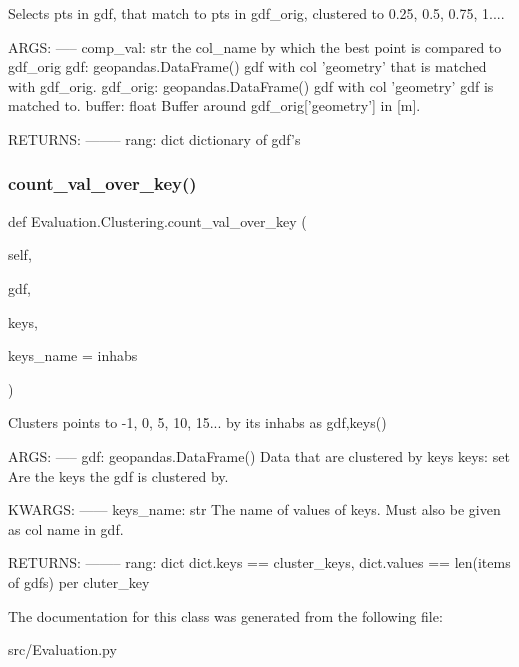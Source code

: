 \begin{DoxyVerb}Selects pts in gdf, that match to pts in gdf_orig,
clustered to 0.25, 0.5, 0.75, 1....

ARGS:
-----
comp_val: str
    the col_name by which the best point is compared to gdf_orig
gdf: geopandas.DataFrame()
    gdf with col 'geometry' that is matched with gdf_orig.
gdf_orig: geopandas.DataFrame()
    gdf with col 'geometry' gdf is matched to.
buffer: float
    Buffer around gdf_orig['geometry'] in [m].

RETURNS:
--------
rang: dict
    dictionary of gdf's
\end{DoxyVerb}
 \mbox{\label{class_evaluation_1_1_clustering_a97093141aaad40fcc7a8df2f214200bb}} 
\subsubsection{\texorpdfstring{count\+\_\+val\+\_\+over\+\_\+key()}{count\_val\_over\_key()}}
{\footnotesize\ttfamily def Evaluation.\+Clustering.\+count\+\_\+val\+\_\+over\+\_\+key (\begin{DoxyParamCaption}\item[{}]{self,  }\item[{}]{gdf,  }\item[{}]{keys,  }\item[{}]{keys\+\_\+name = {\ttfamily \textquotesingle{}inhabs\textquotesingle{}} }\end{DoxyParamCaption})}

\begin{DoxyVerb}Clusters points to -1, 0, 5, 10, 15... by its inhabs as
    gdf,keys()

ARGS:
-----
gdf: geopandas.DataFrame()
    Data that are clustered by keys
keys: set
    Are the keys the gdf is clustered by.

KWARGS:
------
keys_name: str
    The name of values of keys. Must also be given as col name in gdf.

RETURNS:
--------
rang: dict
    dict.keys == cluster_keys, dict.values == len(items of gdfs) per
    cluter_key
\end{DoxyVerb}
 

The documentation for this class was generated from the following file\+:\begin{DoxyCompactItemize}
\item 
src/Evaluation.\+py\end{DoxyCompactItemize}
